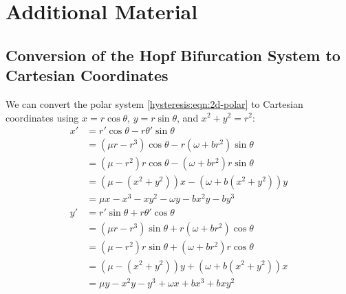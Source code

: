 \newpage

\section*{Additional Material}

\subsection*{Conversion of the Hopf Bifurcation System to Cartesian Coordinates}

We can convert the polar system \eqref{hysteresis:eqn:2d-polar} to Cartesian coordinates using $x = r \cos \theta$, $y = r \sin \theta$, and $x^2 + y^2 = r^2$:
\begin{align*}
    x'
    &= r' \cos \theta - r \theta' \sin \theta \\
    &= \left(\mu r - r^3\right) \cos \theta - r \left(\omega + b r^2\right) \sin \theta \\
    &= \left(\mu - r^2\right) r \cos \theta - \left(\omega + b r^2\right) r \sin \theta \\
    &= \left(\mu - \left(x^2 + y^2\right)\right) x - \left(\omega + b \left(x^2 + y^2\right)\right) y \\
    &= \mu x - x^3 - x y^2 - \omega y - b x^2 y - b y^3 \\
    y'
    &= r' \sin \theta + r \theta' \cos \theta \\
    &= \left(\mu r - r^3\right) \sin \theta + r \left(\omega + b r^2\right) \cos \theta \\
    &= \left(\mu - r^2\right) r \sin \theta + \left(\omega + b r^2\right) r \cos \theta \\
    &= \left(\mu - \left(x^2 + y^2\right)\right) y + \left(\omega + b \left(x^2 + y^2\right)\right) x \\
    &= \mu y - x^2 y - y^3 + \omega x + b x^3 + b x y^2
\end{align*}
